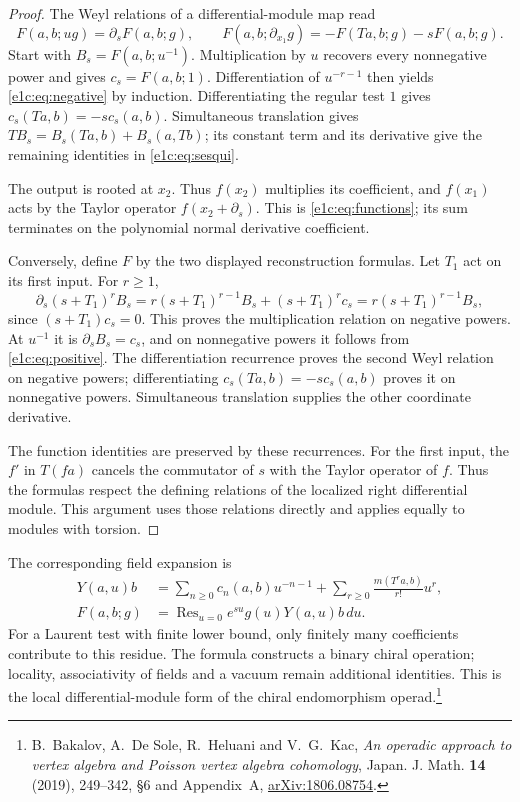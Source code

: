 \begin{proof}
The Weyl relations of a differential-module map read
\[
 F(a,b;ug)=\partial_sF(a,b;g),
 \qquad
 F(a,b;\partial_{x_1}g)=-F(Ta,b;g)-sF(a,b;g).
\]
Start with \(B_s=F(a,b;u^{-1})\). Multiplication by \(u\)
recovers every nonnegative power and gives \(c_s=F(a,b;1)\).
Differentiation of \(u^{-r-1}\) then yields
\eqref{e1c:eq:negative} by induction. Differentiating the
regular test \(1\) gives \(c_s(Ta,b)=-sc_s(a,b)\).
Simultaneous translation gives
\(TB_s=B_s(Ta,b)+B_s(a,Tb)\); its constant term and its
derivative give the remaining identities in
\eqref{e1c:eq:sesqui}.

The output is rooted at \(x_2\). Thus \(f(x_2)\) multiplies
its coefficient, and \(f(x_1)\) acts by the Taylor operator
\(f(x_2+\partial_s)\). This is
\eqref{e1c:eq:functions}; its sum terminates on the polynomial
normal derivative coefficient.

Conversely, define \(F\) by the two displayed reconstruction
formulas. Let \(T_1\) act on its first input. For \(r\geq1\),
\[
 \partial_s(s+T_1)^rB_s
 =r(s+T_1)^{r-1}B_s+(s+T_1)^rc_s
 =r(s+T_1)^{r-1}B_s,
\]
since \((s+T_1)c_s=0\). This proves the multiplication
relation on negative powers. At \(u^{-1}\) it is
\(\partial_sB_s=c_s\), and on nonnegative powers it follows
from \eqref{e1c:eq:positive}. The differentiation recurrence
proves the second Weyl relation on negative powers; differentiating
\(c_s(Ta,b)=-sc_s(a,b)\) proves it on nonnegative powers.
Simultaneous translation supplies the other coordinate derivative.

The function identities are preserved by these recurrences.
For the first input, the \(f'\) in \(T(fa)\) cancels the
commutator of \(s\) with the Taylor operator of \(f\).
Thus the formulas respect the defining relations of the
localized right differential module. This argument uses those
relations directly and applies equally to modules with torsion.
\end{proof}

The corresponding field expansion is
\begin{equation}\label{e1c:eq:series}
 \begin{aligned}
 Y(a,u)b&=\sum_{n\geq0}c_n(a,b)u^{-n-1}
       +\sum_{r\geq0}\frac{m(T^ra,b)}{r!}u^r,\\
 F(a,b;g)&=\operatorname{Res}_{u=0}
                   e^{su}g(u)Y(a,u)b\,du.
 \end{aligned}
\end{equation}
For a Laurent test with finite lower bound, only finitely many
coefficients contribute to this residue. The formula constructs
a binary chiral operation; locality, associativity of fields
and a vacuum remain additional identities.
This is the local differential-module form of the chiral
endomorphism operad.\footnote{B.~Bakalov, A.~De Sole,
R.~Heluani and V.~G.~Kac, \emph{An operadic approach to vertex
algebra and Poisson vertex algebra cohomology}, Japan. J. Math.
\textbf{14} (2019), 249--342, \S6 and Appendix~A,
\href{https://arxiv.org/abs/1806.08754}{arXiv:1806.08754}.}

